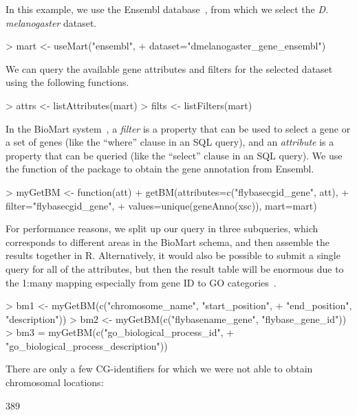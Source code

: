 %
In this example, we use the Ensembl database~\cite{Ensembl2006}, from
which we select the \textit{D. melanogaster} dataset.
%
\begin{Schunk}
\begin{Sinput}
> mart <- useMart("ensembl", 
+                 dataset="dmelanogaster_gene_ensembl")
\end{Sinput}
\end{Schunk}
% 
We can query the available gene attributes and filters for the
selected dataset using the following functions.
\begin{Schunk}
\begin{Sinput}
> attrs <- listAttributes(mart)
> filts <- listFilters(mart)
\end{Sinput}
\end{Schunk}
%
In the BioMart system~\cite{Kasprzyk2004}, a \emph{filter} is a
property that can be used to select a gene or a set of genes (like the
``where'' clause in an SQL query), and an \emph{attribute} is a
property that can be queried (like the ``select'' clause in an SQL
query). We use the  function of the package
 to obtain the gene annotation from Ensembl.
%
\begin{Schunk}
\begin{Sinput}
> myGetBM <- function(att)
+     getBM(attributes=c("flybasecgid_gene", att), 
+           filter="flybasecgid_gene", 
+           values=unique(geneAnno(xsc)), mart=mart)
\end{Sinput}
\end{Schunk}
% 
For performance reasons, we split up our query in three subqueries,
which corresponds to different areas in the BioMart schema, and then
assemble the results together in R.  Alternatively, it would also be
possible to submit a single query for all of the attributes, but then
the result table will be enormous due to the 1:many mapping
especially from gene ID to GO categories~\cite{GO}.
%
\begin{Schunk}
\begin{Sinput}
> bm1 <- myGetBM(c("chromosome_name", "start_position", 
+                  "end_position", "description"))
> bm2 <- myGetBM(c("flybasename_gene", "flybase_gene_id"))
> bm3 = myGetBM(c("go_biological_process_id", 
+                 "go_biological_process_description"))
\end{Sinput}
\end{Schunk}
%
There are only a few CG-identifiers for which we were not able to
obtain chromosomal locations: 
%
\begin{Schunk}
\begin{Soutput}
[1] 389
\end{Soutput}
\end{Schunk}
